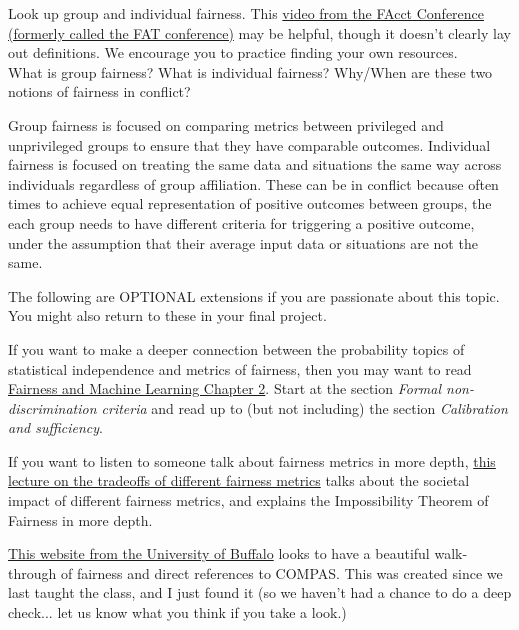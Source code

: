 \documentclass[assignment03_Solutions]{subfiles}
\begin{document}
\begin{exercise}
Look up group and individual fairness. This \href{https://www.youtube.com/watch?v=kok73C50RLA}{video from the FAcct Conference (formerly called the FAT conference)} may be helpful, though it doesn't clearly lay out definitions. We encourage you to practice finding your own resources. \\

What is group fairness? What is individual fairness? Why/When are these two notions of fairness in conflict?
\begin{boxedsolution}
Group fairness is focused on comparing metrics between privileged and unprivileged groups to ensure that they have comparable outcomes. Individual fairness is focused on treating the same data and situations the same way across individuals regardless of group affiliation. These can be in conflict because often times to achieve equal representation of positive outcomes between groups, the each group needs to have different criteria for triggering a positive outcome, under the assumption that their average input data or situations are not the same.
\end{boxedsolution}
\end{exercise}

\begin{externalresources}
The following are OPTIONAL extensions if you are passionate about this topic. You might also return to these in your final project.

\bes
\item If you want to make a deeper connection between the probability topics of statistical independence and metrics of fairness, then you may want to read \href{https://fairmlbook.org/classification.html}{Fairness and Machine Learning Chapter 2}.  Start at the section \emph{Formal non-discrimination criteria} and read up to (but not including) the section \emph{Calibration and sufficiency}.

\item If you want to listen to someone talk about fairness metrics in more depth, \href{https://www.youtube.com/watch?v=jIXIuYdnyyk}{this lecture on the tradeoffs of different fairness metrics} talks about the societal impact of different fairness metrics, and explains the Impossibility Theorem of Fairness in more depth.

\item \href{http://www-student.cse.buffalo.edu/~atri/algo-and-society/support/notes/fairness/index.html}{This website from the University of Buffalo} looks to have a beautiful walk-through of fairness and direct references to COMPAS. This was created since we last taught the class, and I just found it (so we haven't had a chance to do a deep check... let us know what you think if you take a look.)
\ees
\end{externalresources}
\end{document}
